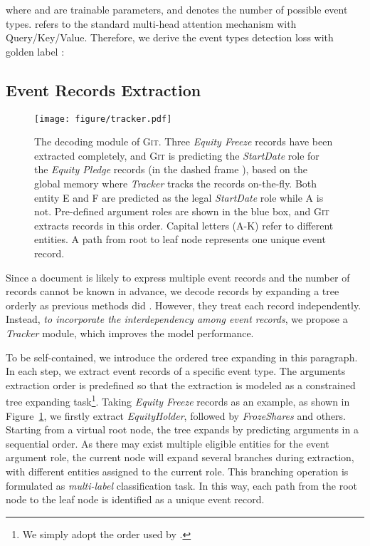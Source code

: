 \documentclass[11pt,a4paper]{article}
\newcommand{\modelname}{\textsc{Git}\xspace}
\newcommand\dboxed[1]{\dbox{\strut{#1}}}
\begin{document}
where  and  are trainable parameters, and  denotes the number of possible event types.
 refers to the standard multi-head attention mechanism with Query/Key/Value.
Therefore, we derive the event types detection loss with golden label :


\subsection{Event Records Extraction}
\label{sec:records_extraction}
\begin{figure}[t]
    \centering
    \texttt{[image: figure/tracker.pdf]}
    \caption{The decoding module of \modelname.
    Three \textit{Equity Freeze} records have been extracted completely, and \modelname is predicting the \textit{StartDate} role for the \textit{Equity Pledge} records (in the dashed frame \dboxed{} ), based on the global memory where \textit{Tracker} tracks the records on-the-fly. 
    Both entity E and F are predicted as the legal \textit{StartDate} role while A is not.
    Pre-defined argument roles are shown in the blue box, and \modelname extracts records in this order.
    Capital letters (A-K) refer to different entities. 
    A path from root to leaf node represents one unique event record.
    }
    \label{fig:tracker}
\end{figure}

Since a document is likely to express multiple event records and the number of records cannot be known in advance, we decode records by  expanding a tree orderly as previous methods did \citep{zheng-etal-2019-doc2edag}. 
However, they treat each record independently.
Instead, \emph{to incorporate the interdependency among event records}, we propose a \textit{Tracker} module, which improves the model performance.

To be self-contained, we introduce the ordered tree expanding in this paragraph.
In each step, we extract event records of a specific event type. 
The arguments extraction order is predefined so that the extraction is modeled as a constrained tree expanding task\footnote{We simply adopt the order used by \citet{zheng-etal-2019-doc2edag}.}.
Taking \textit{Equity Freeze} records as an example, as shown in Figure~\ref{fig:tracker}, we firstly extract \textit{EquityHolder}, followed by \textit{FrozeShares} and others.
Starting from a virtual root node, the tree expands by predicting arguments in a sequential order. 
As there may exist multiple eligible entities for the event argument role, the current node will expand several branches during extraction, with different entities assigned to the current role.
This branching operation is formulated as \emph{multi-label} classification task.
In this way, each path from the root node to the leaf node is identified as a unique event record.
\end{document}
